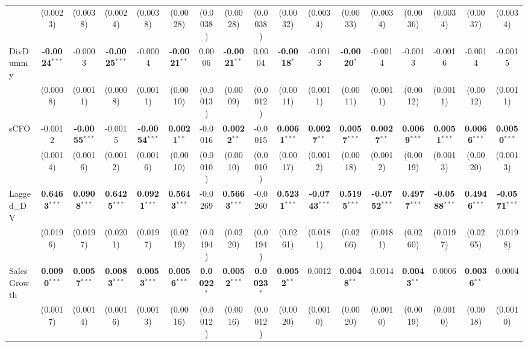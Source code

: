 \begin{landscape}
\begin{table}[H]
\begin{tabular}{lcccccccccccccccc}
 & (0.0023) & (0.0038) & (0.0024) & (0.0038) & (0.0028) & (0.0038) & (0.0028) & (0.0038) & (0.0032) & (0.0034) & (0.0033) & (0.0034) & (0.0036) & (0.0034) & (0.0037) & (0.0034) \\
DivDummy & \textbf{-0.0024}$^{***}$ & -0.0003 & \textbf{-0.0025}$^{***}$ & -0.0004 & \textbf{-0.0021}$^{**}$ & 0.0006 & \textbf{-0.0021}$^{**}$ & 0.0004 & \textbf{-0.0018}$^{*}$ & -0.0013 & \textbf{-0.0020}$^{*}$ & -0.0014 & -0.0013 & -0.0016 & -0.0014 & -0.0015 \\
 & (0.0008) & (0.0011) & (0.0008) & (0.0011) & (0.0010) & (0.0013) & (0.0009) & (0.0012) & (0.0011) & (0.0011) & (0.0011) & (0.0011) & (0.0012) & (0.0011) & (0.0012) & (0.0011) \\
sCFO & -0.0012 & \textbf{-0.0055}$^{***}$ & -0.0015 & \textbf{-0.0054}$^{***}$ & \textbf{0.0021}$^{**}$ & -0.0016 & \textbf{0.0022}$^{**}$ & -0.0015 & \textbf{0.0061}$^{***}$ & \textbf{0.0027}$^{**}$ & \textbf{0.0057}$^{***}$ & \textbf{0.0027}$^{**}$ & \textbf{0.0069}$^{***}$ & \textbf{0.0051}$^{***}$ & \textbf{0.0066}$^{***}$ & \textbf{0.0050}$^{***}$ \\
 & (0.0014) & (0.0016) & (0.0012) & (0.0016) & (0.0010) & (0.0010) & (0.0010) & (0.0010) & (0.0017) & (0.0012) & (0.0018) & (0.0012) & (0.0019) & (0.0013) & (0.0020) & (0.0013) \\
Lagged\_DV & \textbf{0.6463}$^{***}$ & \textbf{0.0908}$^{***}$ & \textbf{0.6425}$^{***}$ & \textbf{0.0921}$^{***}$ & \textbf{0.5643}$^{***}$ & -0.0269 & \textbf{0.5663}$^{***}$ & -0.0260 & \textbf{0.5231}$^{***}$ & \textbf{-0.0743}$^{***}$ & \textbf{0.5195}$^{***}$ & \textbf{-0.0752}$^{***}$ & \textbf{0.4977}$^{***}$ & \textbf{-0.0588}$^{***}$ & \textbf{0.4946}$^{***}$ & \textbf{-0.0571}$^{***}$ \\
 & (0.0196) & (0.0197) & (0.0201) & (0.0197) & (0.0219) & (0.0194) & (0.0220) & (0.0194) & (0.0261) & (0.0181) & (0.0266) & (0.0181) & (0.0260) & (0.0197) & (0.0265) & (0.0198) \\
SalesGrowth & \textbf{0.0090}$^{***}$ & \textbf{0.0057}$^{***}$ & \textbf{0.0083}$^{***}$ & \textbf{0.0053}$^{***}$ & \textbf{0.0056}$^{***}$ & \textbf{0.0022}$^{*}$ & \textbf{0.0052}$^{***}$ & \textbf{0.0023}$^{*}$ & \textbf{0.0052}$^{**}$ & 0.0012 & \textbf{0.0048}$^{**}$ & 0.0014 & \textbf{0.0043}$^{**}$ & 0.0006 & \textbf{0.0036}$^{**}$ & 0.0004 \\
 & (0.0017) & (0.0014) & (0.0016) & (0.0013) & (0.0016) & (0.0012) & (0.0016) & (0.0012) & (0.0020) & (0.0010) & (0.0020) & (0.0010) & (0.0019) & (0.0010) & (0.0018) & (0.0010) \\

\end{tabular}
\end{table}
\end{landscape}
